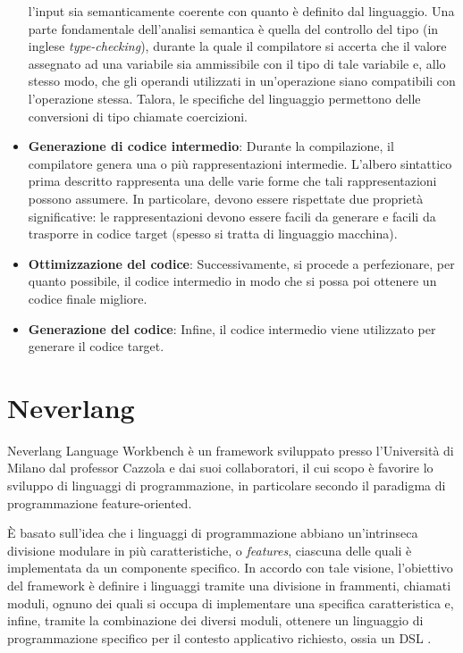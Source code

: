 \documentclass[12pt,a4paper,openright,twoside]{book}
\begin{document}
\begin{itemize}
    l'input sia semanticamente coerente con quanto è definito dal linguaggio. Una parte fondamentale dell'analisi semantica è quella del 
    controllo del tipo (in inglese \textit{type-checking}), durante la quale il compilatore si accerta che il valore assegnato ad una 
    variabile sia ammissibile con il tipo di tale variabile e, allo stesso modo, che gli operandi utilizzati in un’operazione siano 
    compatibili con l’operazione stessa. Talora, le specifiche del linguaggio permettono delle conversioni di tipo chiamate coercizioni.
    \item \textbf{Generazione di codice intermedio}: Durante la compilazione, il compilatore genera una o più rappresentazioni intermedie. 
    L'albero sintattico prima descritto rappresenta una delle varie forme che tali rappresentazioni possono assumere. In particolare, devono 
    essere rispettate due proprietà significative: le rappresentazioni devono essere facili da generare e facili da trasporre in codice 
    target (spesso si tratta di linguaggio macchina).
    \item \textbf{Ottimizzazione del codice}: Successivamente, si procede a perfezionare, per quanto possibile, il codice intermedio in modo 
    che si possa poi ottenere un codice finale migliore.
    \item \textbf{Generazione del codice}: Infine, il codice intermedio viene utilizzato per generare il codice target.
\end{itemize}

\section{Neverlang}
Neverlang Language Workbench è un framework sviluppato presso l’Università di Milano dal professor Cazzola e dai suoi collaboratori, il cui 
scopo è favorire lo sviluppo di linguaggi di programmazione, in particolare secondo il paradigma di programmazione feature-oriented.

È basato sull’idea che i linguaggi di programmazione abbiano un’intrinseca divisione modulare in più caratteristiche, o \textit{features}, ciascuna 
delle quali è implementata da un componente specifico. In accordo con tale visione, l’obiettivo del framework è definire i linguaggi tramite 
una divisione in frammenti, chiamati moduli, ognuno dei quali si occupa di implementare una specifica caratteristica e, infine, tramite la 
combinazione dei diversi moduli, ottenere un linguaggio di programmazione specifico per il contesto applicativo richiesto, ossia un  
\ac{DSL} \cite{NeverlangWebsite}.
\end{document}
